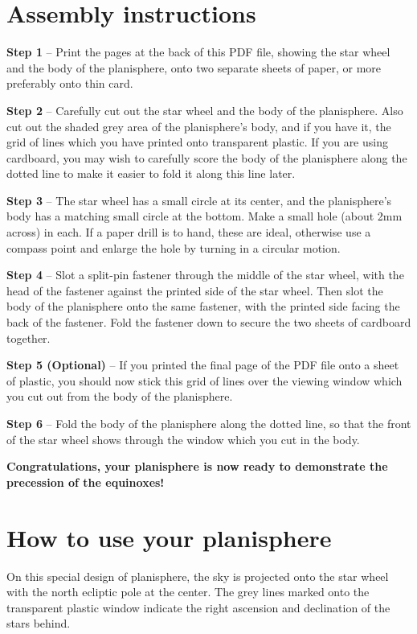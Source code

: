\documentclass[a4paper,onecolumn,10pt]{article}
\begin{document}
\section*{Assembly instructions}

{\bf Step 1} -- Print the pages at the back of this PDF file, showing the
star wheel and the body of the planisphere, onto two separate sheets of paper,
or more preferably onto thin card.

{\bf Step 2} -- Carefully cut out the star wheel and the body of the
planisphere. Also cut out the shaded grey area of the planisphere's body, and
if you have it, the grid of lines which you have printed onto transparent
plastic. If you are using cardboard, you may wish to carefully score the body
of the planisphere along the dotted line to make it easier to fold it along
this line later.

{\bf Step 3} -- The star wheel has a small circle at its center, and the
planisphere's body has a matching small circle at the bottom. Make a small hole
(about 2mm across) in each. If a paper drill is to hand, these are ideal,
otherwise use a compass point and enlarge the hole by turning in a circular
motion.

{\bf Step 4} -- Slot a split-pin fastener through the middle of the
star wheel, with the head of the fastener against the printed side of the
star wheel. Then slot the body of the planisphere onto the same fastener, with
the printed side facing the back of the fastener. Fold the fastener down to
secure the two sheets of cardboard together.

{\bf Step 5 (Optional)} -- If you printed the final page of the PDF file
onto a sheet of plastic, you should now stick this grid of lines over the
viewing window which you cut out from the body of the planisphere.

{\bf Step 6} -- Fold the body of the planisphere along the dotted line,
so that the front of the star wheel shows through the window which you cut in
the body.

{\bf Congratulations, your planisphere is now ready to demonstrate the
precession of the equinoxes!}

\section*{How to use your planisphere}

On this special design of planisphere, the sky is projected onto the star wheel
with the north ecliptic pole at the center. The grey lines marked onto the
transparent plastic window indicate the right ascension and declination of the
stars behind.
\end{document}
